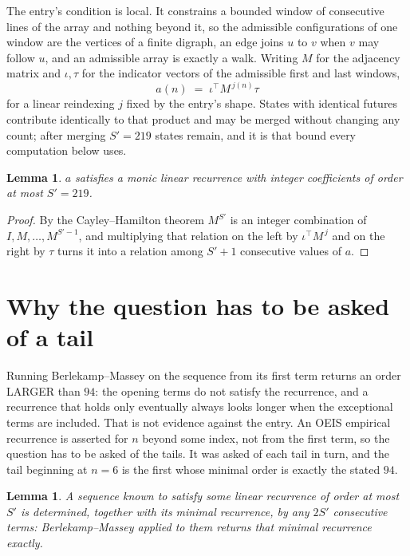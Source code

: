 \documentclass[11pt,a4paper]{article}
\theoremstyle{plain}
\newtheorem{lemma}[theorem]{Lemma}
\theoremstyle{definition}
\begin{document}
The entry's condition is local. It constrains a bounded window of consecutive lines of the
array and nothing beyond it, so the admissible configurations of one window are the vertices of
a finite digraph, an edge joins $u$ to $v$ when $v$ may follow $u$, and an admissible array is
exactly a walk. Writing $M$ for the adjacency matrix and $\iota,\tau$ for the indicator vectors
of the admissible first and last windows,
\[
a(n)\;=\;\iota^{\!\top}M^{\,j(n)}\tau
\]
for a linear reindexing $j$ fixed by the entry's shape. States with identical futures
contribute identically to that product and may be merged without changing any count; after
merging $S'=219$ states remain, and it is that bound every computation below uses.

\begin{lemma}\label{lem:cf}
$a$ satisfies a monic linear recurrence with integer coefficients of order at most $S'=219$.
\end{lemma}

\begin{proof}
By the Cayley--Hamilton theorem $M^{S'}$ is an integer combination of $I,M,\dots,M^{S'-1}$,
and multiplying that relation on the left by $\iota^{\!\top}M^{\,j}$ and on the right by
$\tau$ turns it into a relation among $S'+1$ consecutive values of $a$.
\end{proof}

\section{Why the question has to be asked of a tail}

Running Berlekamp--Massey on the sequence from its first term returns an order LARGER than $94$: the opening terms do not satisfy the recurrence, and a recurrence that holds only eventually always looks longer when the exceptional terms are included. That is not evidence against the entry. An OEIS empirical recurrence is asserted for $n$ beyond some index, not from the first term, so the question has to be asked of the tails. It was asked of each tail in turn, and the tail beginning at $n=6$ is the first whose minimal order is exactly the stated $94$.

\begin{lemma}\label{lem:bm}
A sequence known to satisfy some linear recurrence of order at most $S'$ is determined,
together with its minimal recurrence, by any $2S'$ consecutive terms: Berlekamp--Massey applied
to them returns that minimal recurrence exactly.
\end{lemma}
\end{document}
